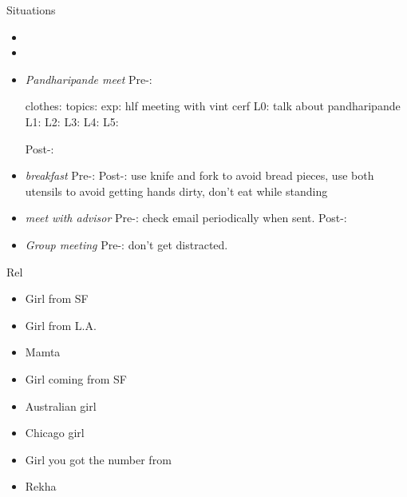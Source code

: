 \begin{frame}
\begin{columns}
\begin{column}{0.20\linewidth}
\begin{block}{Situations}
        \begin{itemize} 

        \item \tiny \item 
          \tiny \item \tiny {} \textit{Pandharipande
            meet} Pre-: 

          clothes: 
          topics: exp: hlf meeting with vint cerf L0: talk about pandharipande  L1:    L2:     L3:  L4:   L5: 

           Post-: 
          
           \tiny \item \tiny \textit{breakfast} Pre-: Post-: use knife and
           fork to avoid bread pieces, use both utensils to avoid
           getting hands dirty, don't eat while standing 
          \tiny \item \tiny \textit{meet with advisor} Pre-: check
          email periodically when sent. Post-: 
        \item \tiny \textit{Group meeting} Pre-: don't get
          distracted. 
        \end{itemize} 

      \end{block}






\begin{block}{Rel}
  \begin{itemize} 
    \small \item \small Girl from SF 
    \small \item \small Girl from L.A. 
    \small \item \small Mamta 
\small \item \small Girl coming from SF 

    \item \small Australian girl
    \small \item \small Chicago girl 
    \small \item \small Girl you got the number from 
    \small \item \small Rekha


\end{itemize}
\end{block}
\end{column}
\end{columns}
\end{frame}

